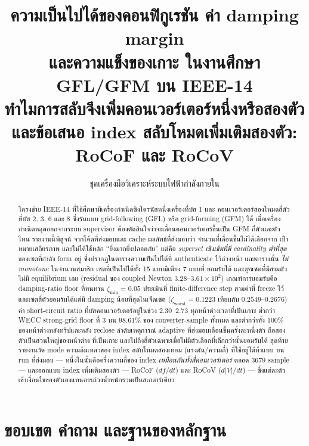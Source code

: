 \documentclass[12pt,a4paper]{article}
\title{\bfseries ความเป็นไปได้ของคอนฟิกูเรชัน ค่า damping margin\\[2pt]
และความแข็งของเกาะ ในงานศึกษา GFL/GFM บน IEEE-14\\[8pt]
\large ทำไมการสลับจึงเพิ่มคอนเวอร์เตอร์หนึ่งหรือสองตัว\\
และข้อเสนอ index สลับโหมดเพิ่มเติมสองตัว: RoCoF และ RoCoV}
\author{ชุดเครื่องมือวิเคราะห์ระบบไฟฟ้ากำลังภายใน}
\date{}
\theoremstyle{remark}
\newcommand{\zmin}{\zeta_{\min}}
\newcommand{\zworst}{\zeta_{\mathrm{worst}}}
\begin{document}
\maketitle
\thispagestyle{fancy}

\begin{abstract}
\noindent
โครงข่าย IEEE-14 ที่ใช้ศึกษามีเครื่องกำเนิดซิงโครนัสหนึ่งเครื่องที่บัส 1 และ
คอนเวอร์เตอร์สองโหมดสี่ตัวที่บัส 2, 3, 6 และ 8 ซึ่งรันแบบ grid-following (GFL)
หรือ grid-forming (GFM) ได้ เมื่อเครื่องกำเนิดหลุดออกจากระบบ supervisor
ต้องตัดสินใจว่าจะเลื่อนคอนเวอร์เตอร์ขึ้นเป็น GFM กี่ตัวและตัวไหน รายงานนี้พิสูจน์
จากโค้ดที่ส่งมอบและ cache ผลลัพธ์ที่ส่งมอบว่า จำนวนที่เลื่อนขึ้นไม่ได้เลือกจาก
เป้าหมายเสถียรภาพ และไม่ได้ใช้หลัก ``ยิ่งมากยิ่งปลอดภัย'' แต่คือ
\emph{superset เชิงเข้มที่มี cardinality ต่ำที่สุด} ของเซตที่กำลัง form อยู่
ซึ่งปรากฏในตารางความเป็นไปได้ที่ authenticate ไว้ล่วงหน้า และตารางนั้น
\emph{ไม่ monotone} ในจำนวนสมาชิก เซตที่เป็นไปได้ทั้ง 15 แบบมีเพียง 7 แบบที่
ยอมรับได้ และ\emph{ทุก}เซตที่มีสามตัวไม่มี equilibrium เลย (residual ของ
coupled Newton $3.28$--$3.61\times10^{2}$) เกณฑ์การยอมรับคือ damping-ratio floor
ที่ทนทาน $\zmin = 0.05$ ประเมินที่ finite-difference step สามค่าที่ freeze ไว้
และเซตสี่ตัวยอมรับได้แต่มี damping น้อยที่สุดในเจ็ดเซต
($\zworst = 0.1223$ เทียบกับ $0.2549$--$0.2676$) ค่า short-circuit ratio
ที่บัสคอนเวอร์เตอร์อยู่ในช่วง $2.30$--$2.73$ ทุกหน้าต่างเวลาที่เป็นเกาะ
ต่ำกว่า WECC strong-grid floor ที่ 3 บน $98.61\%$ ของ converter-sample ทั้งหมด
และต่ำกว่าทั้ง $100\%$ ของหน้าต่างหลังทริปและหลัง reclose ลำดับเหตุการณ์
adaptive ที่ส่งมอบเลื่อนขึ้นครั้งละหนึ่งตัว ถือสองตัวเป็นส่วนใหญ่ของหน้าต่าง
ที่เป็นเกาะ และไปถึงสี่ตัวเฉพาะเมื่อไม่มีตัวเลือกที่เล็กกว่านั้นยอมรับได้
สุดท้าย รายงานวัด mode ความล้มเหลวของ index สลับโหมดสองเทอม (แรงดัน/ความถี่)
ที่ใช้อยู่ได้ห้าแบบ บน run ที่ส่งมอบ --- หนึ่งในนั้นคือครึ่งความถี่ของ index
\emph{เหมือนกันทั้งสี่คอนเวอร์เตอร์} ตลอด $3679$ sample --- และออกแบบ index
เพิ่มเติมสองตัว --- RoCoF ($df/dt$) และ RoCoV ($d|V|/dt$) --- ซึ่งแต่ละตัว
เข้าเงื่อนไขของตัวเองแทนการถ่วงน้ำหนักรวมเป็นสเกลาร์เดียว
\end{abstract}

\tableofcontents
\clearpage

\section{ขอบเขต คำถาม และฐานของหลักฐาน}
\end{document}
